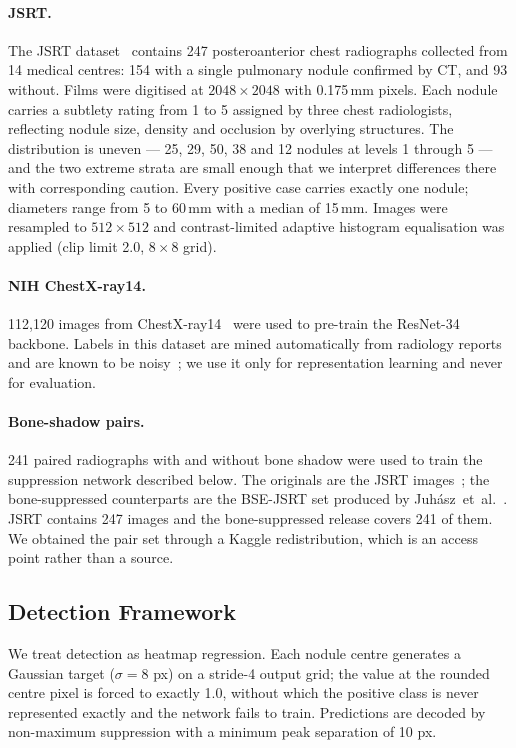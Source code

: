 \documentclass[11pt,a4paper]{article}
\begin{document}
\paragraph{JSRT.}
The JSRT dataset~\cite{shiraishi2000jsrt} contains 247 posteroanterior chest
radiographs collected from 14 medical centres: 154 with a single pulmonary
nodule confirmed by CT, and 93 without. Films were digitised at
$2048 \times 2048$ with 0.175\,mm pixels. Each nodule carries a subtlety rating
from 1 to 5 assigned by three chest radiologists, reflecting nodule size,
density and occlusion by overlying structures. The distribution is uneven --- 25, 29, 50, 38 and 12 nodules at
levels 1 through 5 --- and the two extreme strata are small enough that we
interpret differences there with corresponding caution. Every positive case
carries exactly one nodule; diameters range from 5 to 60\,mm with a median of
15\,mm. Images were resampled
to $512 \times 512$ and contrast-limited adaptive histogram equalisation was
applied (clip limit 2.0, $8 \times 8$ grid).

\paragraph{NIH ChestX-ray14.}
112{,}120 images from ChestX-ray14~\cite{wang2017chestxray} were used to
pre-train the ResNet-34 backbone. Labels in this
dataset are mined automatically from radiology reports and are known to be
noisy~\cite{oakdenrayner2020exploring}; we use it only for representation
learning and never for evaluation.

\paragraph{Bone-shadow pairs.}
241 paired radiographs with and without bone shadow were used to train the
suppression network described below. The originals are the JSRT
images~\cite{shiraishi2000jsrt}; the bone-suppressed counterparts are the
BSE-JSRT set produced by Juh\'asz~et~al.~\cite{juhasz2010bse}. JSRT contains 247
images and the bone-suppressed release covers 241 of them. We obtained the pair
set through a Kaggle redistribution, which is an access point rather than a
source.

\subsection{Detection Framework}

We treat detection as heatmap regression. Each nodule centre generates a
Gaussian target ($\sigma = 8$ px) on a stride-4 output grid; the value at the
rounded centre pixel is forced to exactly 1.0, without which the positive class
is never represented exactly and the network fails to train. Predictions are
decoded by non-maximum suppression with a minimum peak separation of 10 px.
\end{document}
